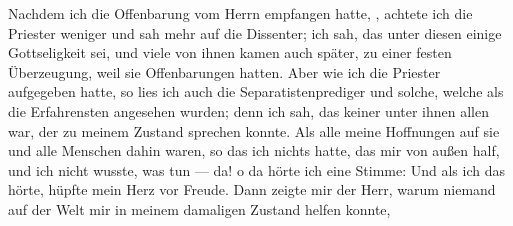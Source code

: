 Nachdem ich die Offenbarung vom Herrn empfangen hatte,
, achtete ich die Priester weniger und
sah mehr auf die Dissenter; ich sah, das unter diesen einige
Gottseligkeit sei, und viele von ihnen kamen auch später, zu einer
festen Überzeugung, weil sie Offenbarungen hatten. Aber wie
ich die Priester aufgegeben hatte, so lies ich auch die 
Separatistenprediger und solche, welche als die Erfahrensten angesehen
wurden; denn ich sah, das keiner unter ihnen allen war, der zu meinem
Zustand sprechen konnte. Als alle meine Hoffnungen auf sie und alle
Menschen dahin waren, so das ich nichts hatte, das mir von außen
half, und ich nicht wusste, was tun — da! o da hörte ich eine
Stimme:  Und als ich das hörte, hüpfte mein
Herz vor Freude. Dann zeigte mir der Herr, warum niemand
auf der Welt mir in meinem damaligen Zustand helfen konnte,

